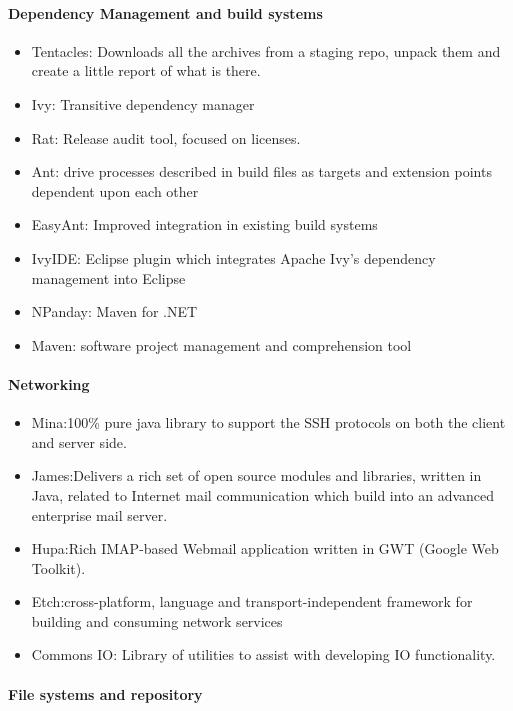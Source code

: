 \documentclass[natbib]{svjour3}
\providecommand{\tightlist}{%
  \setlength{\itemsep}{0pt}\setlength{\parskip}{0pt}}
\let\oldparagraph\paragraph
\renewcommand{\paragraph}[1]{\oldparagraph{#1}\mbox{}}
\begin{document}
\paragraph{Dependency Management and build
systems}\label{dependency-management-and-build-systems}

\begin{itemize}
\tightlist
\item
  Tentacles: Downloads all the archives from a staging repo, unpack them
  and create a little report of what is there.
\item
  Ivy: Transitive dependency manager
\item
  Rat: Release audit tool, focused on licenses.
\item
  Ant: drive processes described in build files as targets and extension
  points dependent upon each other
\item
  EasyAnt: Improved integration in existing build systems
\item
  IvyIDE: Eclipse plugin which integrates Apache Ivy's dependency
  management into Eclipse
\item
  NPanday: Maven for .NET
\item
  Maven: software project management and comprehension tool
\end{itemize}

\paragraph{Networking}\label{networking}

\begin{itemize}
\tightlist
\item
  Mina:100\% pure java library to support the SSH protocols on both the
  client and server side.
\item
  James:Delivers a rich set of open source modules and libraries,
  written in Java, related to Internet mail communication which build
  into an advanced enterprise mail server.
\item
  Hupa:Rich IMAP-based Webmail application written in GWT (Google Web
  Toolkit).
\item
  Etch:cross-platform, language and transport-independent framework for
  building and consuming network services
\item
  Commons IO: Library of utilities to assist with developing IO
  functionality.
\end{itemize}

\paragraph{File systems and
repository}\label{file-systems-and-repository}
\end{document}
